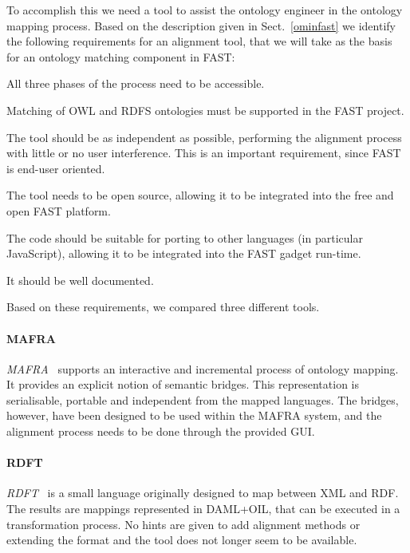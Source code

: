 To accomplish this we need a tool to assist the ontology engineer in the ontology mapping process.
Based on the description given in Sect.~\ref{ominfast} we identify the following requirements for an alignment tool, that we will take as the basis for an ontology matching component in FAST:
\begin{inparaenum}[(i)]
\item All three phases of the process need to be accessible.
\item Matching of OWL and RDFS ontologies must be supported in the FAST project.
\item The tool should be as independent as possible, performing the alignment process with little or no user interference. This is an important requirement, since FAST is end-user oriented.
\item The tool needs to be open source, allowing it to be integrated into the free and open FAST platform.
\item The code should be suitable for porting to other languages (in particular JavaScript), allowing it to be integrated into the FAST gadget run-time.
\item It should be well documented.
\end{inparaenum}

Based on these requirements, we compared three different tools. 
\paragraph{MAFRA} \emph{MAFRA}~\cite{maedche2002mafra} supports an interactive and incremental process of ontology mapping. It provides an explicit notion of semantic bridges. This representation is serialisable, portable and independent from the mapped languages. The bridges, however, have been designed to be used within the MAFRA system, and the alignment process needs to be done through the provided GUI. 

\paragraph{RDFT} \emph{RDFT}~\cite{omelayenko2002rdft} is a small language originally designed to map between XML and RDF. The results are mappings represented in DAML+OIL, that can be executed in a transformation process. No hints are given to add alignment methods or extending the format and the tool does not longer seem to be available. 

